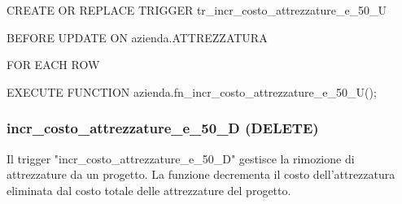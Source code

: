     \ttfamily
        \begin{flushleft}
            \begin{description}
                \item CREATE OR REPLACE TRIGGER tr\_incr\_costo\_attrezzature\_e\_50\_U
                \item BEFORE UPDATE ON azienda.ATTREZZATURA
                \item FOR EACH ROW
                \item EXECUTE FUNCTION azienda.fn\_incr\_costo\_attrezzature\_e\_50\_U();
            \end{description}
        \end{flushleft}
    \normalfont



    \subsubsection{incr\_costo\_attrezzature\_e\_50\_D (DELETE)}
    Il trigger "incr\_costo\_attrezzature\_e\_50\_D" gestisce la rimozione di attrezzature da un progetto. La funzione decrementa il costo dell'attrezzatura eliminata dal costo totale delle attrezzature del progetto.
    \ttfamily
